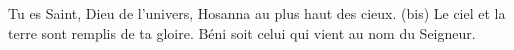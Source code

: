 Tu es Saint, Dieu de l'univers, Hosanna au plus haut des cieux. (bis)      
Le ciel et la terre sont remplis de ta gloire. 
Béni soit celui qui vient au nom du Seigneur.
